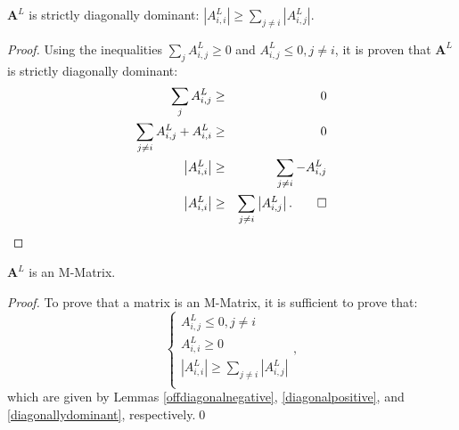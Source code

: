 \begin{lemma}\label{diagonallydominant}
   $\mathbf{A}^L$ is strictly diagonally dominant:
   $\left|A^L_{i,i}\right| \ge \sum\limits_{j\ne i} \left|A^L_{i,j}\right|$.
\end{lemma}
\begin{proof}
Using the inequalities $\sum\limits_j A^L_{i,j} \ge 0$ and $A^L_{i,j}\le 0, j\ne i$,
it is proven that $\mathbf{A}^L$ is strictly diagonally dominant:
\begin{eqnarray*}
	\sum\limits_j A^L_{i,j} & \ge & 0\\
	\sum\limits_{j\ne i} A^L_{i,j} + A^L_{i,i} & \ge & 0\\
	\left|A^L_{i,i}\right| & \ge & \sum\limits_{j\ne i} -A^L_{i,j}\\
	\left|A^L_{i,i}\right| & \ge & \sum\limits_{j\ne i} \left|A^L_{i,j}\right|.\qed
\end{eqnarray*}
\end{proof}

\begin{lemma}
   $\mathbf{A}^L$ is an M-Matrix.
\end{lemma}
\begin{proof}
To prove that a matrix is an M-Matrix, it is sufficient to prove that:
\[
\left\{\begin{array}{l}
A^L_{i,j}\le 0, j\ne i\\
A^L_{i,i}\ge 0\\
\left|A^L_{i,i}\right| \ge \sum\limits_{j\ne i} \left|A^L_{i,j}\right|\\
\end{array}
\right.,
\]
which are given by Lemmas \ref{offdiagonalnegative}, \ref{diagonalpositive}, and
\ref{diagonallydominant}, respectively.\qed
\end{proof}

